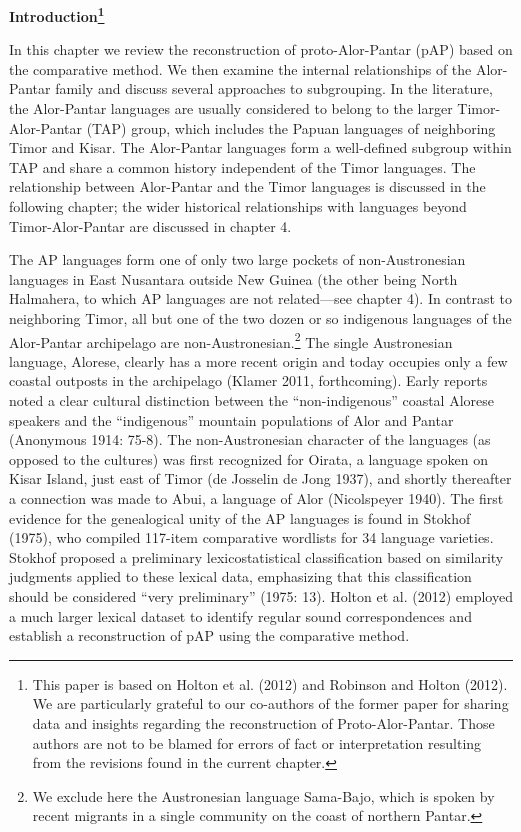 {\bfseries
\hypertarget{RefHeading49911871885726}{}\hypertarget{Toc376957608}{}Introduction\footnote{ This paper is based on Holton et al. (2012) and Robinson and Holton (2012). We are particularly grateful to our co-authors of the former paper for sharing data and insights regarding the reconstruction of Proto-Alor-Pantar. Those authors are not to be blamed for errors of fact or interpretation resulting from the revisions found in the current chapter.}}

In this chapter we review the reconstruction of proto-Alor-Pantar (pAP) based on the comparative method. We then examine the internal relationships of the Alor-Pantar family and discuss several approaches to subgrouping. In the literature, the Alor-Pantar languages are usually considered to belong to the larger Timor-Alor-Pantar (TAP) group, which includes the Papuan languages of neighboring Timor and Kisar. The Alor-Pantar languages form a well-defined subgroup within TAP and share a common history independent of the Timor languages. The relationship between Alor-Pantar and the Timor languages is discussed in the following chapter; the wider historical relationships with languages beyond Timor-Alor-Pantar are discussed in chapter 4. 

The AP languages form one of only two large pockets of non-Austronesian languages in East Nusantara outside New Guinea (the other being North Halmahera, to which AP languages are not related---see chapter 4). In contrast to neighboring Timor, all but one of the two dozen or so indigenous languages of the Alor-Pantar archipelago are non-Austronesian.\footnote{ We exclude here the Austronesian language Sama-Bajo, which is spoken by recent migrants in a single community on the coast of northern Pantar.} The single Austronesian language, Alorese, clearly has a more recent origin and today occupies only a few coastal outposts in the archipelago (Klamer 2011, forthcoming). Early reports noted a clear cultural distinction between the {\textquotedblleft}non-indigenous{\textquotedblright} coastal Alorese speakers and the {\textquotedblleft}indigenous{\textquotedblright} mountain populations of Alor and Pantar (Anonymous 1914: 75-8). The non-Austronesian character of the languages (as opposed to the cultures) was 
first recognized for Oirata, a language spoken on Kisar Island, just east of Timor (de Josselin de Jong 1937), and shortly thereafter a connection was made to Abui, a language of Alor (Nicolspeyer 1940). The first evidence for the genealogical unity of the AP languages is found in Stokhof (1975), who compiled 117-item comparative wordlists for 34 language varieties. Stokhof proposed a preliminary lexicostatistical classification based on similarity judgments applied to these lexical data, emphasizing that this classification should be considered {\textquotedblleft}very preliminary{\textquotedblright} (1975: 13). Holton et al. (2012) employed a much larger lexical dataset to identify regular sound correspondences and establish a reconstruction of pAP using the comparative method. 

